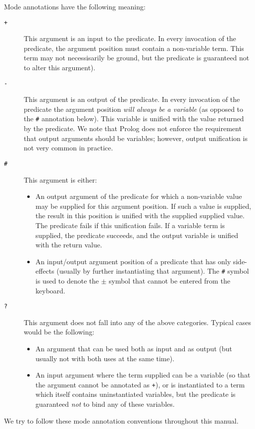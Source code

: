 Mode annotations have the following meaning:
\begin{description}
\item[{\tt +}]
	This argument is an input to the predicate.  In every invocation
	of the predicate, the argument position must contain a non-variable
	term.  This term may not necessisarily be ground, but the 
	predicate is guaranteed not to alter this argument).

\item[{\tt -}]
	This argument is an output of the predicate.  In every
	invocation of the predicate the argument
	position {\em will always be a variable\/} (as opposed to 
	the {\tt \#} annotation below).
	This variable is unified with the value returned by the predicate.
	We note that Prolog does not enforce the requirement that output
	arguments should be variables; however, output unification is not
	very common in practice.

\item[{\tt \#}]
	This argument is either:
	\begin{itemize}
	\item	An output argument of the predicate for which a non-variable
		value may be supplied for this argument position.  If such a
		value is supplied, the result in this position is unified with
		the supplied supplied value.  The predicate fails if this
		unification fails.  If a variable term is supplied, the
		predicate succeeds, and the output variable is unified with
		the return value.

	\item	An input/output argument position of a predicate that has
		only side-effects (usually by further instantiating that
		argument).  The {\tt \#} symbol is used to denote the $\pm$
		symbol that cannot be entered from the keyboard.
	\end{itemize}
\item[{\tt ?}]
	This argument does not fall into any of the above categories. 
        Typical cases would be the following:
	\begin{itemize}
	\item	An argument that can be used both as input and as output
		(but usually not with both uses at the same time).

	\item	An input argument where the term supplied can be a variable
		(so that the argument cannot be annotated as {\tt +}), or is
		instantiated to a term which itself contains uninstantiated
		variables, but the predicate is guaranteed {\em not\/} to
		bind any of these variables.

	\end{itemize}
\end{description}
We try to follow these mode annotation conventions throughout this manual.

